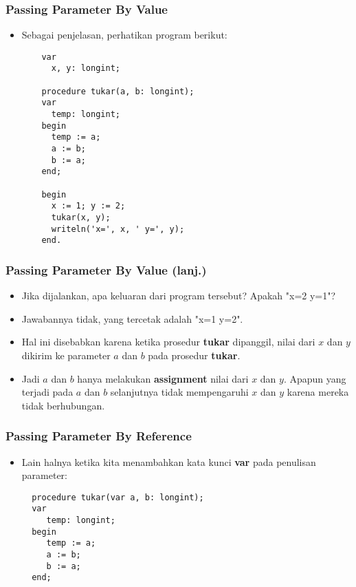 \begin{frame}[fragile]
\frametitle{Passing Parameter By Value}
\begin{itemize}
  \item Sebagai penjelasan, perhatikan program berikut:
  \begin{lstlisting}
    var
      x, y: longint;

    procedure tukar(a, b: longint);
    var
      temp: longint;
    begin
      temp := a;
      a := b;
      b := a;
    end;

    begin
      x := 1; y := 2;
      tukar(x, y);
      writeln('x=', x, ' y=', y);
    end.
  \end{lstlisting}
\end{itemize}
\end{frame}

\begin{frame}[fragile]
\frametitle{Passing Parameter By Value (lanj.)}
\begin{itemize}
  \item Jika dijalankan, apa keluaran dari program tersebut? Apakah "x=2 y=1"?
  \item Jawabannya \alert{tidak}, yang tercetak adalah "x=1 y=2".
  \item Hal ini disebabkan karena ketika prosedur \textbf{tukar} dipanggil, \alert{nilai} dari $x$ dan $y$ dikirim ke parameter $a$ dan $b$ pada prosedur \textbf{tukar}.
  \item Jadi $a$ dan $b$ hanya melakukan \textbf{assignment} nilai dari $x$ dan $y$. Apapun yang terjadi pada $a$ dan $b$ selanjutnya tidak mempengaruhi $x$ dan $y$ karena mereka \alert{tidak berhubungan}.
\end{itemize}
\end{frame}

\begin{frame}[fragile]
\frametitle{Passing Parameter By Reference}
\begin{itemize}
  \item Lain halnya ketika kita menambahkan kata kunci \textbf{var} pada penulisan parameter:
  \begin{lstlisting}
  procedure tukar(var a, b: longint);
  var
     temp: longint;
  begin
     temp := a;
     a := b;
     b := a;
  end;
  \end{lstlisting}
\end{itemize}
\end{frame}

